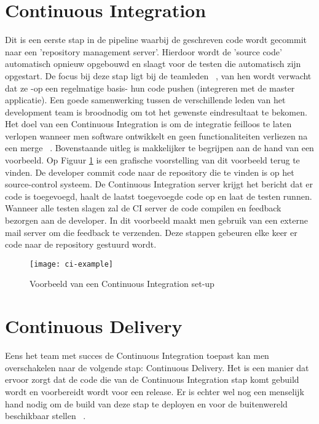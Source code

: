 
\section{Continuous Integration}
\label{sec:continuous-integration}
    Dit is een eerste stap in de pipeline waarbij de geschreven code wordt gecommit naar een 'repository management server'. Hierdoor wordt de 'source code' automatisch opnieuw opgebouwd en slaagt voor de testen die automatisch zijn opgestart. De focus bij deze stap ligt bij de teamleden ~\autocite{Fowler2006}, van hen wordt verwacht dat ze -op een regelmatige basis- hun code pushen (integreren met de master applicatie). Een goede samenwerking tussen de verschillende leden van het development team is broodnodig om tot het gewenste eindresultaat te bekomen.
    Het doel van een Continuous Integration is om de integratie feilloos te laten verlopen wanneer men software ontwikkelt en geen functionaliteiten verliezen na een merge ~\autocite{Riti2018}.
    \newline
    Bovenstaande uitleg is makkelijker te begrijpen aan de hand van een voorbeeld. Op Figuur \ref{img-ci-example} is een grafische voorstelling van dit voorbeeld terug te vinden.
    De developer commit code naar de repository die te vinden is op het source-control systeem. De Continuous Integration server krijgt het bericht dat er code is toegevoegd, haalt de laatst toegevoegde code op en laat de testen runnen. Wanneer alle testen slagen zal de CI server de code compilen en feedback bezorgen aan de developer. In dit voorbeeld maakt men gebruik van een externe mail server om die feedback te verzenden.
    Deze stappen gebeuren elke keer er code naar de repository gestuurd wordt.

    \begin{figure}	
        \texttt{[image: ci-example]}
        \caption{Voorbeeld van een Continuous Integration set-up ~\autocite{Riti2018}} \label{img-ci-example}
    \end{figure}

\section{Continuous Delivery}
\label{sec:continuous-delivery}
    Eens het team met succes de Continuous Integration toepast kan men overschakelen naar de volgende stap: Continuous Delivery.
    Het is een manier dat ervoor zorgt dat de code die van de Continuous Integration stap komt gebuild wordt en voorbereidt wordt voor een release.
    Er is echter wel nog een menselijk hand nodig om de build van deze stap te deployen en voor de buitenwereld beschikbaar stellen ~\autocite{Fowler2013}.
    

